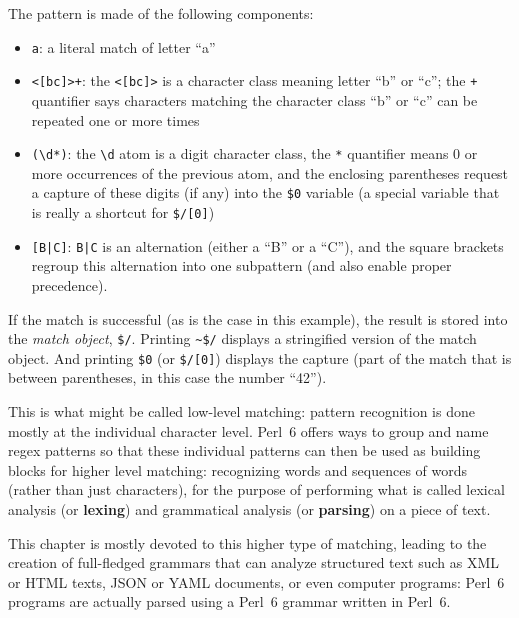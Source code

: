 The pattern is made of the following components:
\begin{itemize}

\item \verb'a': a literal match of letter ``a''

\item \verb'<[bc]>+': the \verb'<[bc]>' is a character class 
meaning letter ``b'' or ``c''; the \verb'+' quantifier 
says characters matching the character class ``b'' or ``c'' 
can be repeated one or more times

\item \verb'(\d*)': the \verb'\d' atom is a digit character 
class, the \verb'*' quantifier means 0 or more occurrences 
of the previous atom, and the enclosing parentheses request 
a capture of these digits (if any) into the \verb'$0' 
variable (a special variable that is really a shortcut 
for \verb'$/[0]')

\item \verb'[B|C]': \verb'B|C' is an alternation (either 
a ``B'' or a ``C''), and the square brackets regroup this 
alternation into one subpattern (and also enable proper 
precedence).

\end{itemize}

If the match is successful (as is the case in this example), 
the result is stored into the \emph{match object}, \verb'$/'.
Printing \verb'~$/' displays a stringified version of the 
match object. And printing \verb'$0' (or \verb'$/[0]') 
displays the capture (part of the match that is between 
parentheses, in this case the number ``42'').

This is what might be called low-level matching: pattern 
recognition is done mostly at the individual character level.
Perl~6 offers ways to group and name regex patterns so that 
these individual patterns can then be used as building 
blocks for higher level matching: recognizing words and 
sequences of words (rather than just characters), for the 
purpose of performing what is called lexical analysis 
(or {\bf lexing}) and grammatical analysis (or {\bf parsing}) 
on a piece of text. 

This chapter is mostly devoted to this higher type 
of matching, leading to the creation of full-fledged grammars 
that can analyze structured text such as XML or HTML texts, 
JSON or YAML documents, or even computer programs: Perl~6 
programs are actually parsed using a Perl~6 grammar written 
in Perl~6.

